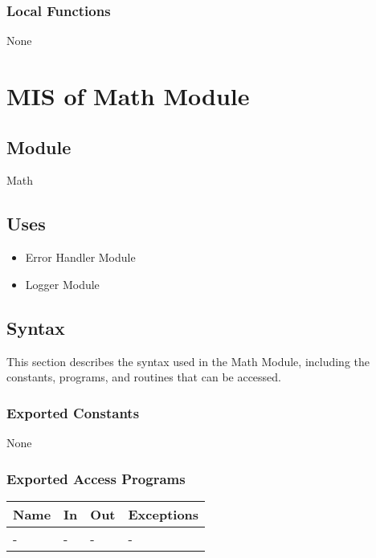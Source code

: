 \documentclass[12pt, titlepage]{article}
\begin{document}
\subsubsection{Local Functions}

None

\newpage

\section{MIS of Math Module} \label{MIS_Math}

\subsection{Module}

Math

\subsection{Uses}

\begin{itemize}
\item Error Handler Module
\item Logger Module
\end{itemize}

\subsection{Syntax}

This section describes the syntax used in the Math Module, including the
constants, programs, and routines that can be accessed.

\subsubsection{Exported Constants}

None

\subsubsection{Exported Access Programs}

\begin{center}
\begin{tabular}{p{2cm} p{4cm} p{4cm} p{2cm}}
\hline
\textbf{Name} & \textbf{In} & \textbf{Out} & \textbf{Exceptions} \\
\hline
- & - & - & - \\
\hline
\end{tabular}
\end{center}
\end{document}

